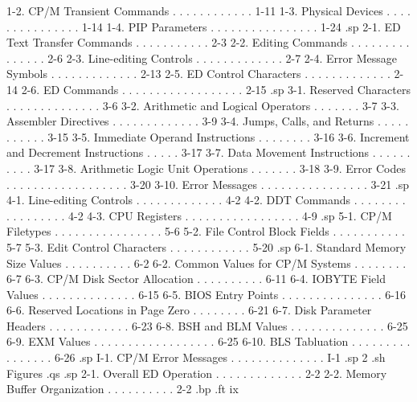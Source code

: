      1-2.   CP/M Transient Commands . . . . . . . . . . . .  1-11
     1-3.   Physical Devices  . . . . . . . . . . . . . . .  1-14
     1-4.   PIP Parameters  . . . . . . . . . . . . . . . .  1-24
.sp
     2-1.   ED Text Transfer Commands . . . . . . . . . . .   2-3
     2-2.   Editing Commands  . . . . . . . . . . . . . . .   2-6
     2-3.   Line-editing Controls . . . . . . . . . . . . .   2-7
     2-4.   Error Message Symbols . . . . . . . . . . . . .  2-13
     2-5.   ED Control Characters . . . . . . . . . . . . .  2-14
     2-6.   ED Commands . . . . . . . . . . . . . . . . . .  2-15
.sp
     3-1.   Reserved Characters . . . . . . . . . . . . . .   3-6
     3-2.   Arithmetic and Logical Operators  . . . . . . .   3-7
     3-3.   Assembler Directives  . . . . . . . . . . . . .   3-9
     3-4.   Jumps, Calls, and Returns . . . . . . . . . . .  3-15
     3-5.   Immediate Operand Instructions  . . . . . . . .  3-16
     3-6.   Increment and Decrement Instructions  . . . . .  3-17
     3-7.   Data Movement Instructions  . . . . . . . . . .  3-17
     3-8.   Arithmetic Logic Unit Operations  . . . . . . .  3-18
     3-9.   Error Codes . . . . . . . . . . . . . . . . . .  3-20
     3-10.  Error Messages  . . . . . . . . . . . . . . . .  3-21
.sp
     4-1.   Line-editing Controls . . . . . . . . . . . . .   4-2
     4-2.   DDT Commands  . . . . . . . . . . . . . . . . .   4-2
     4-3.   CPU Registers . . . . . . . . . . . . . . . . .   4-9
.sp
     5-1.   CP/M Filetypes  . . . . . . . . . . . . . . . .   5-6
     5-2.   File Control Block Fields . . . . . . . . . . .   5-7
     5-3.   Edit Control Characters . . . . . . . . . . . .  5-20
.sp
     6-1.   Standard Memory Size Values . . . . . . . . . .   6-2
     6-2.   Common Values for CP/M Systems  . . . . . . . .   6-7
     6-3.   CP/M Disk Sector Allocation . . . . . . . . . .  6-11
     6-4.   IOBYTE Field Values . . . . . . . . . . . . . .  6-15
     6-5.   BIOS Entry Points . . . . . . . . . . . . . . .  6-16
     6-6.   Reserved Locations in Page Zero . . . . . . . .  6-21
     6-7.   Disk Parameter Headers  . . . . . . . . . . . .  6-23
     6-8.   BSH and BLM Values  . . . . . . . . . . . . . .  6-25
     6-9.   EXM Values  . . . . . . . . . . . . . . . . . .  6-25
     6-10.  BLS Tabluation  . . . . . . . . . . . . . . . .  6-26
.sp
     I-1.   CP/M Error Messages . . . . . . . . . . . . . .   I-1
.sp 2
.sh
Figures
.qs
.sp
     2-1.   Overall ED Operation  . . . . . . . . . . . . .   2-2
     2-2.   Memory Buffer Organization  . . . . . . . . . .   2-2
.bp
.ft                                ix
